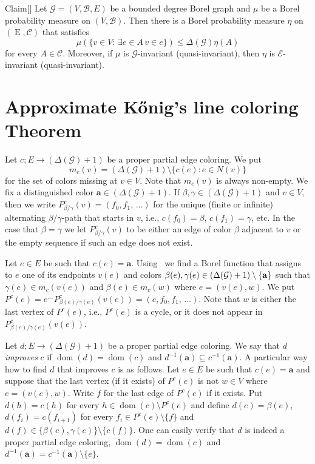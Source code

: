 \documentclass[10pt]{amsart}
\theoremstyle{definition}
\DeclareMathOperator{\dom}{dom}
\newcommand{\fE}{\operatorname{E}}
\newcommand{\bfa}{\mathbf{a}}
\newcommand{\clG}{\mathcal{G}}
\newcommand{\clB}{\mathcal{B}}
\newcommand{\clE}{\mathcal{E}}
\newcommand{\clC}{\mathcal{C}}
\let\oldexists\exists
\renewcommand*{\exists}{\mathrel{\oldexists}}
\begin{document}
\begin{enonce}{Claim}[{\cite[Proposition~3.1]{Vizing}\label{cl:measure on edges}}]
Let $\clG=(V,\clB,E)$ be a bounded degree Borel graph and $\mu$ be a Borel probability measure on $(V,\clB)$. Then there is a Borel probability measure $\eta$ on $(\fE,\clC)$ that satisfies
\[
\mu\left(\{v\in V :\,\exists e\in A \, v\in e\}\right)\le \Delta(\clG)\eta(A)
\]
for every $A\in \clC$. Moreover, if $\mu$ is $\clG$-invariant (quasi-invariant), then $\eta$ is $\clE$-invariant (quasi-invariant).
\end{enonce}



\section{Approximate Kőnig's line coloring Theorem}

Let $c;E\to (\Delta(\clG)+1)$ be a proper partial edge coloring. We put
\[
m_c(v)=(\Delta(\clG)+1)\setminus \{c(e):e\in N(v)\}
\]
for the set of colors missing at $v\in V$. Note that $m_c(v)$ is always non-empty. We fix a distinguished color $\bfa\in (\Delta(\clG)+1)$. If $\beta,\gamma\in (\Delta(\clG)+1)$ and $v\in V$, then we write $P^c_{\beta/\gamma}(v)=(f_0,f_1,\,\dots)$ for the unique (finite or infinite) alternating $\beta/\gamma$-path that starts in $v$, i.e., $c(f_0)=\beta$, $c(f_1)=\gamma$, etc. In the case that $\beta=\gamma$ we let $P^c_{\beta/\gamma}(v)$ to be either an edge of color $\beta$ adjacent to $v$ or the empty sequence if such an edge does not exist.

Let $e\in E$ be such that $c(e)=\bfa$. Using~\cite[Theorem~18.10]{Kec} we find a Borel function that assigns to $e$ one of its endpoints $v(e)$ and colors $\beta(e),\gamma(e)\in (\Delta(\clG)+1)\linebreak\setminus \{\bfa\}$ such that $\gamma(e)\in m_c(v(e))$ and $\beta(e)\in m_c(w)$ where $e=(v(e),w)$. We put $P^c(e)=e^\frown P^c_{\beta(e)/\gamma(e)}(v(e))=(e,f_0,f_1,\,\dots)$. Note that $w$ is either the last vertex of $P^c(e)$, i.e., $P^c(e)$ is a cycle, or it does not appear in $P^c_{\beta(e)/\gamma(e)}(v(e))$.

Let $d;E\to (\Delta(\clG)+1)$ be a proper partial edge coloring. We say that $d$ \emph{improves} $c$ if $\dom(d)=\dom(c)$ and $d^{-1}(\bfa)\subseteq c^{-1}(\bfa)$. A particular way how to find $d$ that improves $c$ is as follows. Let $e\in E$ be such that $c(e)=\bfa$ and suppose that the last vertex (if it exists) of $P^c(e)$ is not $w\in V$ where $e=(v(e),w)$. Write $f$ for the last edge of $P^c(e)$ if it exists. Put $d(h)=c(h)$ for every $h\in \dom(c)\setminus P^c(e)$ and define $d(e)=\beta(e)$, $d(f_i)=c(f_{i+1})$ for every $f_i\in P^c(e)\setminus \{f\}$ and $d(f)\in\{\beta(e),\gamma(e)\}\setminus \{c(f)\}$. One can easily verify that $d$ is indeed a proper partial edge coloring, $\dom(d)=\dom(c)$ and $d^{-1}(\bfa)= c^{-1}(\bfa)\setminus \{e\}$.
\end{document}
